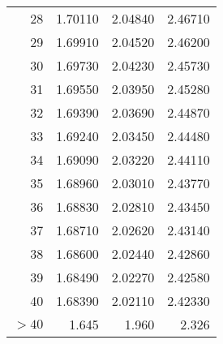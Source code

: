 \documentclass{article}
\begin{document}
\begin{minipage}[t]{6cm}
\begin{center}
\begin{tabular}{|r|rrr|}
				28 & 1.70110 & 2.04840 & 2.46710 \\
				29 & 1.69910 & 2.04520 & 2.46200 \\
				30 & 1.69730 & 2.04230 & 2.45730 \\
				31 & 1.69550 & 2.03950 & 2.45280 \\
				32 & 1.69390 & 2.03690 & 2.44870 \\
				33 & 1.69240 & 2.03450 & 2.44480 \\
				34 & 1.69090 & 2.03220 & 2.44110 \\
				35 & 1.68960 & 2.03010 & 2.43770 \\
				36 & 1.68830 & 2.02810 & 2.43450 \\
				37 & 1.68710 & 2.02620 & 2.43140 \\
				38 & 1.68600 & 2.02440 & 2.42860 \\
				39 & 1.68490 & 2.02270 & 2.42580 \\
				40 & 1.68390 & 2.02110 & 2.42330 \\
				$>40$& 1.645 & 1.960 & 2.326 \\ \hline
			\end{tabular}
		\end{center}
	\end{minipage}\hspace{2cm} 
\end{document}

